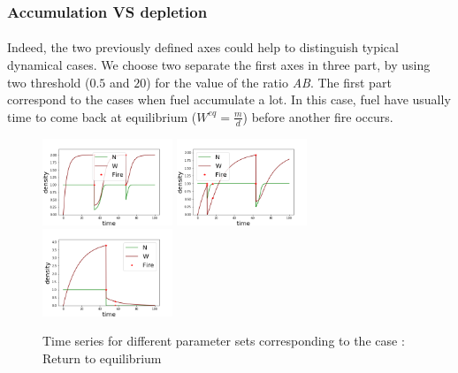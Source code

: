 \documentclass{article}
\begin{document}
\newpage
\subsubsection{Accumulation VS depletion}


\paragraph{}
Indeed, the two previously defined axes could help to distinguish typical dynamical cases. We choose two separate the first axes in three part, by using two threshold ($0.5$ and $20$) for the value of the ratio \textit{AB}. The first part correspond to the cases when fuel accumulate a lot. In this case, fuel have usually time to come back at equilibrium ($W^{eq}=\frac{m}{d}$) before another fire occurs.

\begin{figure}[h!]
\centering
\includegraphics[width=3.9cm]{return_to_eq_1.png}
\includegraphics[width=3.9cm]{return_to_eq_2.png}
\includegraphics[width=3.9cm]{return_to_eq_3.png}
\caption{Time series for different parameter sets corresponding to the case : Return to equilibrium}
\end{figure}
\end{document}
